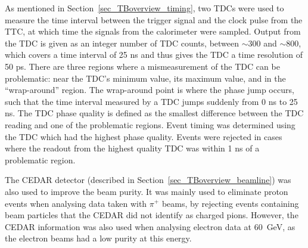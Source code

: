%
%


As mentioned in Section~\ref{sec_TBoverview_timing}, two TDCs were used to measure the time interval between the trigger signal and the clock pulse from the TTC, at which time the signals from the calorimeter were sampled. Output from the TDC is given as an integer number of TDC counts, between $\sim 300$ and $\sim 800$, which covers a time interval of 25 ns and thus gives the TDC a time resolution of 50 ps. There are three regions where a mismeasurement of the TDC can be problematic: near the TDC's minimum value, its maximum value, and in the ``wrap-around'' region. The wrap-around point is where the phase jump occurs, such that the time interval measured by a TDC jumps suddenly from 0 ns to 25 ns. The TDC phase quality is defined as the smallest difference between the TDC reading and one of the problematic regions. Event timing was determined using the TDC which had the highest phase quality. Events were rejected in cases where the readout from the highest quality TDC was within 1 ns of a problematic region.

%
%

The CEDAR detector (described in Section~\ref{sec_TBoverview_beamline}) was also used to improve the beam purity. It was mainly used to eliminate proton events when analysing data taken with $\pi^+$ beams, by rejecting events containing beam particles that the CEDAR did not identify as charged pions. However, the CEDAR information was also used when analysing electron data at 60~GeV, as the electron beams had a low purity at this energy.

